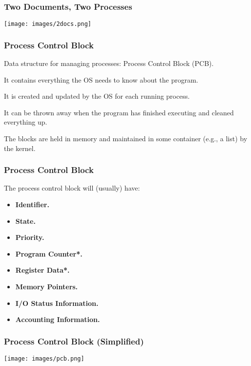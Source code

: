 \begin{frame}
	\frametitle{Two Documents, Two Processes}

	\begin{center}
		\texttt{[image: images/2docs.png]}
	\end{center}


\end{frame}


\begin{frame}
	\frametitle{Process Control Block}

	Data structure for managing processes: \alert{Process Control Block} (PCB).

	It contains everything the OS needs to know about the program.

	It is created and updated by the OS for each running process.

	It can be thrown away when the program has finished executing and cleaned everything up.

	The blocks are held in memory and maintained in some container (e.g., a list) by the kernel.


\end{frame}

\begin{frame}
	\frametitle{Process Control Block}

	The process control block will (usually) have:
	\begin{itemize}
		\item \textbf{Identifier.}
		\item \textbf{State.}
		\item \textbf{Priority.}
		\item \textbf{Program Counter*.}
		\item \textbf{Register Data*.}
		\item \textbf{Memory Pointers.}
		\item \textbf{I/O Status Information.}
		\item \textbf{Accounting Information.}
	\end{itemize}

\end{frame}

\begin{frame}
	\frametitle{Process Control Block (Simplified)}

	\begin{center}
		\texttt{[image: images/pcb.png]}
	\end{center}

\end{frame}

